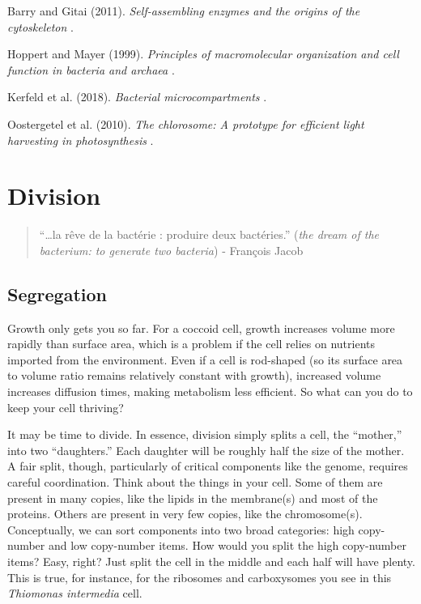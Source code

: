 \documentclass[]{tufte-book}
\begin{document}
Barry and Gitai (2011). \emph{Self-assembling enzymes and the origins of the cytoskeleton} \citep{barry2011}.

Hoppert and Mayer (1999). \emph{Principles of macromolecular organization and cell function in bacteria and archaea} \citep{hoppert1999}.

Kerfeld et al. (2018). \emph{Bacterial microcompartments} \citep{kerfeld2018}.

Oostergetel et al. (2010). \emph{The chlorosome: A prototype for efficient light harvesting in photosynthesis} \citep{oostergetel2010}.

\hypertarget{division}{%
\chapter{Division}\label{division}}

\begin{quote}
``\ldots{}la rêve de la bactérie : produire deux bactéries.'' (\emph{the dream of the bacterium: to generate two bacteria})
- François Jacob \citep{jacob2002a}
\end{quote}

\hypertarget{segregation}{%
\section{Segregation}\label{segregation}}

Growth only gets you so far. For a coccoid cell, growth increases volume more rapidly than surface area, which is a problem if the cell relies on nutrients imported from the environment. Even if a cell is rod-shaped (so its surface area to volume ratio remains relatively constant with growth), increased volume increases diffusion times, making metabolism less efficient. So what can you do to keep your cell thriving?

It may be time to divide. In essence, division simply splits a cell, the ``mother,'' into two ``daughters.'' Each daughter will be roughly half the size of the mother. A fair split, though, particularly of critical components like the genome, requires careful coordination. Think about the things in your cell. Some of them are present in many copies, like the lipids in the membrane(s) and most of the proteins. Others are present in very few copies, like the chromosome(s). Conceptually, we can sort components into two broad categories: high copy-number and low copy-number items. How would you split the high copy-number items? Easy, right? Just split the cell in the middle and each half will have plenty. This is true, for instance, for the ribosomes and carboxysomes you see in this \emph{Thiomonas intermedia} cell.
\end{document}
